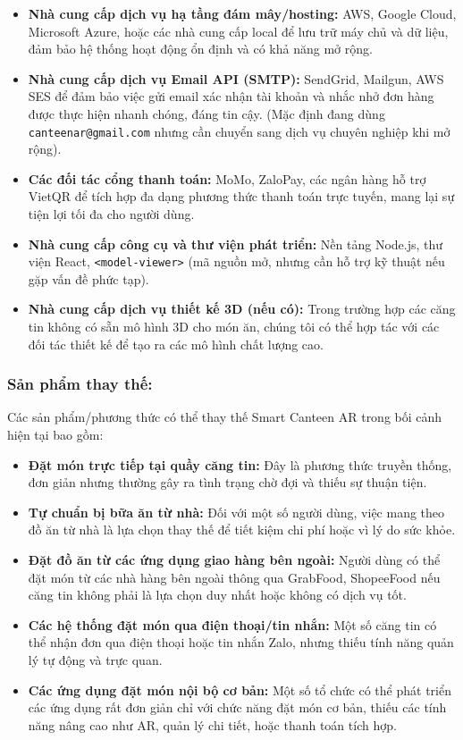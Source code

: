 \documentclass[12pt,a4paper]{article}
\begin{document}
\begin{itemize}[label=\textbullet]
    \item \textbf{Nhà cung cấp dịch vụ hạ tầng đám mây/hosting:} AWS, Google Cloud, Microsoft Azure, hoặc các nhà cung cấp local để lưu trữ máy chủ và dữ liệu, đảm bảo hệ thống hoạt động ổn định và có khả năng mở rộng.
    \item \textbf{Nhà cung cấp dịch vụ Email API (SMTP):} SendGrid, Mailgun, AWS SES để đảm bảo việc gửi email xác nhận tài khoản và nhắc nhở đơn hàng được thực hiện nhanh chóng, đáng tin cậy. (Mặc định đang dùng \texttt{canteenar@gmail.com} nhưng cần chuyển sang dịch vụ chuyên nghiệp khi mở rộng).
    \item \textbf{Các đối tác cổng thanh toán:} MoMo, ZaloPay, các ngân hàng hỗ trợ VietQR để tích hợp đa dạng phương thức thanh toán trực tuyến, mang lại sự tiện lợi tối đa cho người dùng.
    \item \textbf{Nhà cung cấp công cụ và thư viện phát triển:} Nền tảng Node.js, thư viện React, \texttt{<model-viewer>} (mã nguồn mở, nhưng cần hỗ trợ kỹ thuật nếu gặp vấn đề phức tạp).
    \item \textbf{Nhà cung cấp dịch vụ thiết kế 3D (nếu có):} Trong trường hợp các căng tin không có sẵn mô hình 3D cho món ăn, chúng tôi có thể hợp tác với các đối tác thiết kế để tạo ra các mô hình chất lượng cao.
\end{itemize}

\subsubsection{Sản phẩm thay thế:}
Các sản phẩm/phương thức có thể thay thế Smart Canteen AR trong bối cảnh hiện tại bao gồm:

\begin{itemize}[label=\textbullet]
    \item \textbf{Đặt món trực tiếp tại quầy căng tin:} Đây là phương thức truyền thống, đơn giản nhưng thường gây ra tình trạng chờ đợi và thiếu sự thuận tiện.
    \item \textbf{Tự chuẩn bị bữa ăn từ nhà:} Đối với một số người dùng, việc mang theo đồ ăn từ nhà là lựa chọn thay thế để tiết kiệm chi phí hoặc vì lý do sức khỏe.
    \item \textbf{Đặt đồ ăn từ các ứng dụng giao hàng bên ngoài:} Người dùng có thể đặt món từ các nhà hàng bên ngoài thông qua GrabFood, ShopeeFood nếu căng tin không phải là lựa chọn duy nhất hoặc không có dịch vụ tốt.
    \item \textbf{Các hệ thống đặt món qua điện thoại/tin nhắn:} Một số căng tin có thể nhận đơn qua điện thoại hoặc tin nhắn Zalo, nhưng thiếu tính năng quản lý tự động và trực quan.
    \item \textbf{Các ứng dụng đặt món nội bộ cơ bản:} Một số tổ chức có thể phát triển các ứng dụng rất đơn giản chỉ với chức năng đặt món cơ bản, thiếu các tính năng nâng cao như AR, quản lý chi tiết, hoặc thanh toán tích hợp.
\end{itemize}
\end{document}
